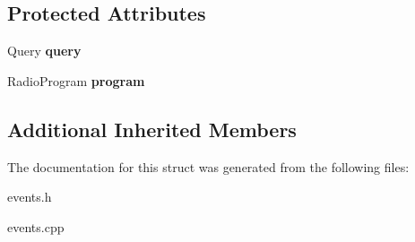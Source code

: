\subsection*{Protected Attributes}
\begin{DoxyCompactItemize}
\item 
Query {\bfseries query}\hypertarget{struct_statistics_query_event___a8051ba260ffcdf4f9c4241de790a3ed9}{}\label{struct_statistics_query_event___a8051ba260ffcdf4f9c4241de790a3ed9}

\item 
Radio\+Program {\bfseries program}\hypertarget{struct_statistics_query_event___ad803163d127b9b09d79491da78cd7425}{}\label{struct_statistics_query_event___ad803163d127b9b09d79491da78cd7425}

\end{DoxyCompactItemize}
\subsection*{Additional Inherited Members}


The documentation for this struct was generated from the following files\+:\begin{DoxyCompactItemize}
\item 
events.\+h\item 
events.\+cpp\end{DoxyCompactItemize}
